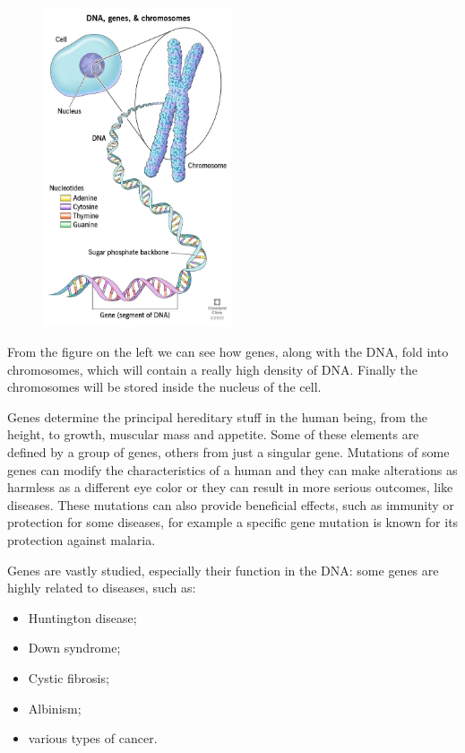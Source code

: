 \begin{figure} %
	\centering
	\includegraphics[width=0.5\textwidth]{res/proteins_overview/genes.png}
\end{figure}

From the figure on the left we can see how genes, along with the DNA, fold into chromosomes, which will contain a really high density of DNA. Finally the chromosomes will be stored inside the nucleus of the cell.

Genes determine the principal hereditary stuff in the human being, from the height, to growth, muscular mass and appetite. Some of these elements are defined by a group of genes, others from just a singular gene. Mutations of some genes can modify the characteristics of a human and they can make alterations as harmless as a different eye color or they can result in more serious outcomes, like diseases. These mutations can also provide beneficial effects, such as immunity or protection for some diseases, for example a specific gene mutation is known for its protection against malaria.

Genes are vastly studied, especially their function in the DNA: some genes are highly related to diseases, such as:
\begin{itemize}
	\item Huntington disease;
	\item Down syndrome;
	\item Cystic fibrosis;
	\item Albinism;
	\item various types of cancer.
\end{itemize}

